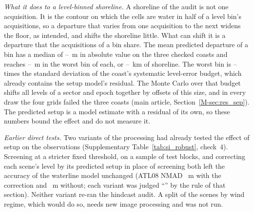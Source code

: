 \emph{What it does to a level-binned shoreline.} A shoreline of the audit is not one acquisition. It is the contour on which the cells are water in half of a level bin's acquisitions, so a departure that varies from one acquisition to the next widens the floor, as intended, and shifts the shoreline little. What can shift it is a departure that the acquisitions of a bin share. The mean predicted departure of a bin has a median of --~m in absolute value on the three checked coasts and reaches --~m in the worst bin of each, or --~km of shoreline. The worst bin is -- times the standard deviation of the coast's systematic level-error budget, which already contains the setup model's residual. The Monte Carlo over that budget shifts all levels of a sector and epoch together by offsets of this size, and in every draw the four grids failed the three coasts (main article, Section~\ref{M-sec:res_sep}). The predicted setup is a model estimate with a residual of its own, so these numbers bound the effect and do not measure it.

\emph{Earlier direct tests.} Two variants of the processing had already tested the effect of setup on the observations (Supplementary Table~\ref{tab:si_robust}, check~4). Screening at a stricter fixed threshold, on a sample of test blocks, and correcting each scene's level by its predicted setup in place of screening both left the accuracy of the waterline model unchanged (ATL08 NMAD ~m with the correction and ~m without; each variant was judged ``'' by the rule of that section). Neither variant re-ran the hindcast audit. A split of the scenes by wind regime, which would do so, needs new image processing and was not run.

